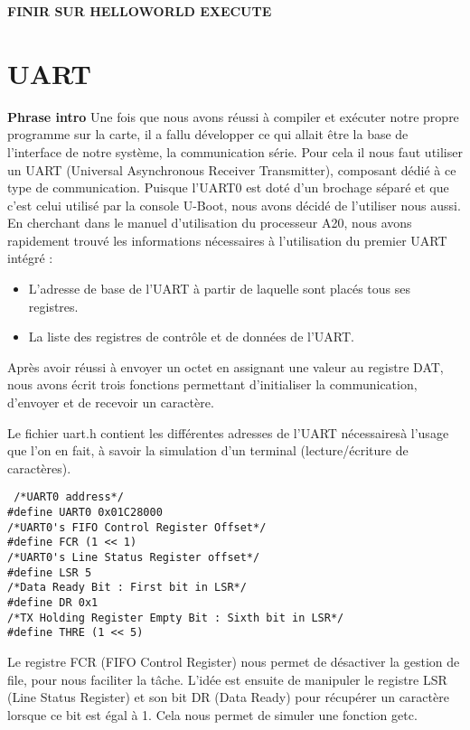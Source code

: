 \documentclass[frenchb]{article}
\begin{document}
{\Huge \textbf{FINIR SUR HELLOWORLD EXECUTE}}

\clearpage
\section{UART}

{\Large\textbf{Phrase intro}}
Une fois que nous avons réussi à compiler et exécuter notre propre programme sur la carte, il a fallu développer ce qui allait être la base de l'interface de notre système, la communication série.
Pour cela il nous faut utiliser un UART (Universal Asynchronous Receiver Transmitter), composant dédié à ce type de communication.
Puisque l'UART0 est doté d'un brochage séparé et que c'est celui utilisé par la console U-Boot, nous avons décidé de l'utiliser nous aussi.
En cherchant dans le manuel d'utilisation du processeur A20, nous avons rapidement trouvé les informations nécessaires à l'utilisation du premier UART intégré :
\begin{itemize}
\item L'adresse de base de l'UART à partir de laquelle sont placés tous ses registres.
\item La liste des registres de contrôle et de données de l'UART.
\end{itemize}
Après avoir réussi à envoyer un octet en assignant une valeur au registre DAT, nous avons écrit trois fonctions permettant d'initialiser la communication, d'envoyer et de recevoir un caractère.

Le fichier \textsf{uart.h} contient les différentes adresses de l'UART nécessairesà l'usage que l'on en fait, à savoir la simulation d'un terminal (lecture/écriture de caractères).

\begin{lstlisting}
 /*UART0 address*/
#define UART0 0x01C28000
/*UART0's FIFO Control Register Offset*/
#define FCR (1 << 1)
/*UART0's Line Status Register offset*/
#define LSR 5
/*Data Ready Bit : First bit in LSR*/
#define DR 0x1
/*TX Holding Register Empty Bit : Sixth bit in LSR*/
#define THRE (1 << 5)
\end{lstlisting}
\vspace*{-0.8cm}

Le registre FCR (FIFO Control Register) nous permet de désactiver la gestion de file, pour nous faciliter la tâche.
L'idée est ensuite de manipuler le registre LSR (Line Status Register) et son bit DR (Data Ready) pour récupérer un caractère lorsque ce bit est égal à 1. Cela nous permet de simuler une fonction \textsf{getc}.
\end{document}
